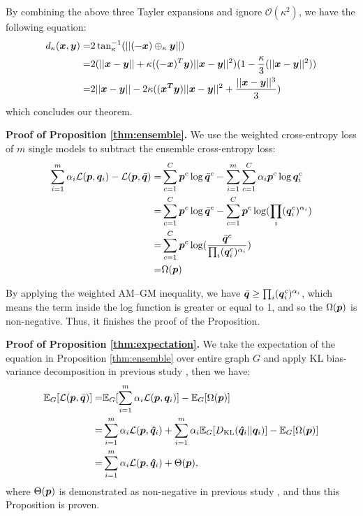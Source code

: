 By combining the above three Tayler expansions and ignore $\mathcal{O}(\kappa^2)$, we have the following equation: 
\begin{equation*}
\begin{aligned}
d_\kappa(\boldsymbol{x}, \boldsymbol{y})=&2\tan_\kappa^{-1}(||(-\boldsymbol{x})\oplus_\kappa\boldsymbol{y}||)\\
=&2(||\boldsymbol{x}-\boldsymbol{y}||+\kappa((-\boldsymbol{x})^T\boldsymbol{y})||\boldsymbol{x}-\boldsymbol{y}||^2)(1-\frac{\kappa}{3}(||\boldsymbol{x}-\boldsymbol{y}||^2))\\
=&2||\boldsymbol{x}-\boldsymbol{y}||-2\kappa((\boldsymbol{x^T}\boldsymbol{y})||\boldsymbol{x}-\boldsymbol{y}||^2+\frac{||\boldsymbol{x}-\boldsymbol{y}||^3}{3})
\end{aligned}
\end{equation*}
which concludes our theorem. {\hfill \qedsymbol}

{\bf Proof of {\update Proposition} \ref{thm:ensemble}.} We use the weighted cross-entropy loss of $m$ single models to subtract the ensemble cross-entropy loss: 
\begin{equation*}
\begin{aligned}
\sum_{i=1}^m\alpha_i\mathcal{L}(\boldsymbol{p}, \boldsymbol{q}_i)-\mathcal{L}(\boldsymbol{p}, \bar{\boldsymbol{q}})=&\sum_{c=1}^C\boldsymbol{p}^c\log\bar{\boldsymbol{q}}^c-\sum_{i=1}^m\sum_{c=1}^C\alpha_i\boldsymbol{p}^c\log\boldsymbol{q}^c_i\\
=&\sum_{c=1}^C\boldsymbol{p}^c\log\bar{\boldsymbol{q}}^c-\sum_{c=1}^C\boldsymbol{p}^c\log(\prod_i(\boldsymbol{q}_i^c)^{\alpha_i})\\
=&\sum_{c=1}^C\boldsymbol{p}^c\log(\frac{\bar{\boldsymbol{q}}^c}{\prod_i(\boldsymbol{q}_i^c)^{\alpha_i}})\\
=&\Omega(\boldsymbol{p})
\end{aligned}
\end{equation*}

By applying the weighted AM–GM inequality, we have $\bar{\boldsymbol{q}}\geq\prod_i(\boldsymbol{q}_i^c)^{\alpha_i}$, which means the term inside the log function is greater or equal to 1, and so the $\Omega(\boldsymbol{p})$ is non-negative. Thus, it finishes the proof of the {\update Proposition}. {\hfill \qedsymbol}

{\bf Proof of {\update Proposition} \ref{thm:expectation}.} We take the expectation of the equation in {\update Proposition} \ref{thm:ensemble} over entire graph $G$ and apply KL bias-variance decomposition in previous study \citep{enstheo23wood}, then we have: 
\begin{equation*}
\begin{aligned}
\mathbb{E}_G[\mathcal{L}(\boldsymbol{p}, \bar{\boldsymbol{q}})]=&\mathbb{E}_G[\sum_{i=1}^m\alpha_i\mathcal{L}(\boldsymbol{p}, \boldsymbol{q}_i)]-\mathbb{E}_G[\Omega(\boldsymbol{p})]\\
=&\sum_{i=1}^m\alpha_i\mathcal{L}(\boldsymbol{p}, \boldsymbol{\hat{q}}_i)+\sum_{i=1}^m\alpha_i\mathbb{E}_G[D_{\mathrm{KL}}(\boldsymbol{\hat{q}}_i||\boldsymbol{q}_i)]-\mathbb{E}_G[\Omega(\boldsymbol{p})]\\
=&\sum_{i=1}^m\alpha_i\mathcal{L}(\boldsymbol{p}, \boldsymbol{\hat{q}}_i)+\Theta(\boldsymbol{p}), 
\end{aligned}
\end{equation*}
where $\Theta(\boldsymbol{p})$ is demonstrated as non-negative in previous study \citep{enstheo23wood}, and thus this {\update Proposition} is proven. {\hfill \qedsymbol}

